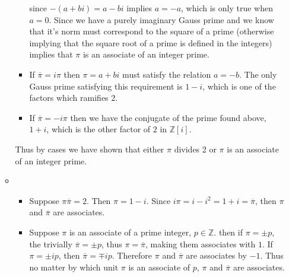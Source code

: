\documentclass[12pt, letterpaper]{article}
\newcommand{\Z}{\mathbb{Z}}
\begin{document}
\begin{enumerate}
\begin{itemize}
\begin{itemize}
			since $-(a+bi) = a-bi$ implies $a = -a$, which is only true when $a=0$.
			Since we have a purely imaginary Gauss prime and we know that it's 
			norm must correspond to the square of a prime (otherwise implying that the square root of a prime is defined in the integers) implies that $\pi$
			is an associate of an integer prime.  
			\item If $\overline{\pi} = i \pi$ then $\pi = a+bi$ must satisfy 
			the relation $a=-b$.  The only Gauss prime satisfying this requirement 
			is $1-i$, which is one of the factors which ramifies $2$.   
			\item If $\overline{\pi} = -i \pi$ then we have the conjugate of the 
			prime found above, $1+i$, which is the other factor of $2$ in $\Z[i]$.
		\end{itemize}
		Thus by cases we have shown that either $\pi$ divides 2 or $\pi$ is an 
		associate of an integer prime.  
		\item 
		\begin{itemize}
			\item Suppose $\pi \overline{\pi} = 2$.  Then $\pi = 1-i$.  
			Since $i\pi = i - i^2 = 1+i = \overline{\pi}$, then $\pi$ and 
			$\overline{\pi}$ are associates.  
			\item Suppose $\pi$ is an associate of a prime integer, $p \in \Z$.  
			then if $\pi = \pm p$, the trivially $\overline{\pi} = \pm p$, thus 
			$\pi = \overline{\pi}$, making them associates with $1$.  
			If $\pi = \pm i p$, then $\overline{\pi} = \mp i p$.  Therefore $\pi$
			and $\overline{\pi}$ are associates by $-1$.  Thus no matter by which 				unit $\pi$ is an associate of $p$, $\pi$ and $\overline{\pi}$ are 
			associates.  
		\end{itemize}
	\end{itemize}
\end{enumerate}
\end{document}
